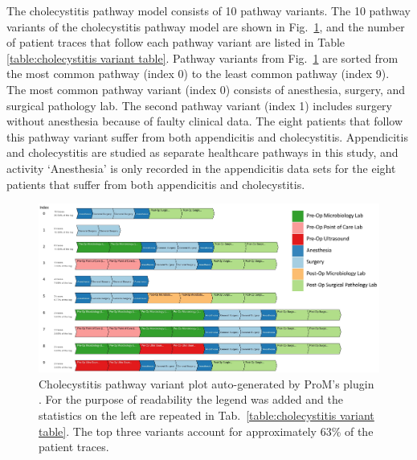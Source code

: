 The cholecystitis pathway model consists of 10 pathway variants. The 10 pathway variants of the cholecystitis pathway model are shown in Fig.~\ref{fig:cholecystitis pathway variants}, and the number of patient traces that follow each pathway variant are listed in Table \ref{table:cholecystitis variant table}. Pathway variants from Fig.~\ref{fig:cholecystitis pathway variants} are sorted from the most common pathway (index 0) to the least common pathway (index 9). The most common pathway variant (index 0) consists of anesthesia, surgery, and surgical pathology lab. The second pathway variant (index 1) includes surgery without anesthesia because of faulty clinical data. The eight patients that follow this pathway variant suffer from both appendicitis and cholecystitis. Appendicitis and cholecystitis are studied as separate healthcare pathways in this study, and activity ‘Anesthesia’ is only recorded in the appendicitis data sets for the eight patients that suffer from both appendicitis and cholecystitis. 

\begin{figure}[t]
\hspace{-2cm}
\includegraphics[width=1.5\textwidth]{images/cholecystitis_variant_index_anes.jpg}
\caption{Cholecystitis pathway variant plot auto-generated by ProM's plugin . For the purpose of readability the legend was added and the statistics on the left are repeated in Tab.~\ref{table:cholecystitis variant table}.
The top three variants account for approximately 63\% of the patient traces.}
\label{fig:cholecystitis pathway variants}
\end{figure}

